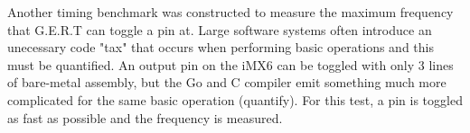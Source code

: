 Another timing benchmark was constructed to measure the maximum frequency
that G.E.R.T can toggle a pin at. Large software systems often introduce
an unecessary code "tax" that occurs when performing basic operations and this must
be quantified. An output pin on the iMX6 can be toggled with only 3 lines of bare-metal
assembly, but the Go and C compiler emit something much more complicated for the same
basic operation (quantify). For this test, a pin is toggled as fast as possible and
the frequency is measured.

